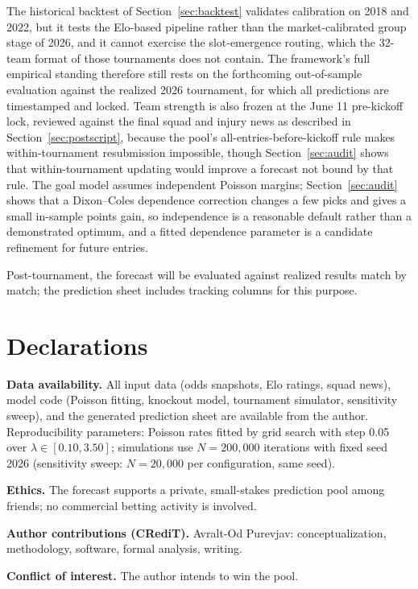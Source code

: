 \documentclass[11pt,letterpaper]{article}
\begin{document}
The historical backtest of Section~\ref{sec:backtest} validates calibration on 2018 and 2022, but it tests the Elo-based pipeline rather than the market-calibrated group stage of 2026, and it cannot exercise the slot-emergence routing, which the 32-team format of those tournaments does not contain. The framework's full empirical standing therefore still rests on the forthcoming out-of-sample evaluation against the realized 2026 tournament, for which all predictions are timestamped and locked. Team strength is also frozen at the June 11 pre-kickoff lock, reviewed against the final squad and injury news as described in Section~\ref{sec:postscript}, because the pool's all-entries-before-kickoff rule makes within-tournament resubmission impossible, though Section~\ref{sec:audit} shows that within-tournament updating would improve a forecast not bound by that rule. The goal model assumes independent Poisson margins; Section~\ref{sec:audit} shows that a Dixon--Coles dependence correction changes a few picks and gives a small in-sample points gain, so independence is a reasonable default rather than a demonstrated optimum, and a fitted dependence parameter is a candidate refinement for future entries.

Post-tournament, the forecast will be evaluated against realized results match by match; the prediction sheet includes tracking columns for this purpose.

\section*{Declarations}

\noindent\textbf{Data availability.} All input data (odds snapshots, Elo ratings, squad news), model code (Poisson fitting, knockout model, tournament simulator, sensitivity sweep), and the generated prediction sheet are available from the author. Reproducibility parameters: Poisson rates fitted by grid search with step 0.05 over $\lambda \in [0.10, 3.50]$; simulations use $N = 200{,}000$ iterations with fixed seed 2026 (sensitivity sweep: $N = 20{,}000$ per configuration, same seed).

\noindent\textbf{Ethics.} The forecast supports a private, small-stakes prediction pool among friends; no commercial betting activity is involved.

\noindent\textbf{Author contributions (CRediT).} Avralt-Od Purevjav: conceptualization, methodology, software, formal analysis, writing.

\noindent\textbf{Conflict of interest.} The author intends to win the pool.
\end{document}
